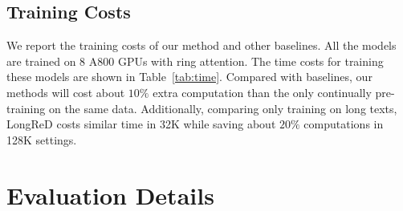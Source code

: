 \subsection{Training Costs}

We report the training costs of our method and other baselines. All the models are trained on 8 A800 GPUs with ring attention. The time costs for training these models are shown in Table~\ref{tab:time}. Compared with baselines, our methods will cost about $10\%$ extra computation than the only continually pre-training on the same data. Additionally, comparing only training on long texts, LongReD costs similar time in 32K while saving about $20\%$ computations in 128K settings.
\begin{table}[htb]
    \centering
    \caption{Training time of Llama-3-8B with different methods and target context windows.}
    \label{tab:time}
\end{table}



\section{Evaluation Details}
\label{app:evaluation}




